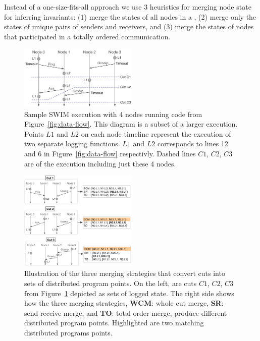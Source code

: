 Instead of a one-size-fits-all approach we use 3 heuristics for
merging node state for inferring invariants: (1) merge the states of
all nodes in a \scc, (2) merge only the states of unique pairs of
senders and receivers, and (3) merge the states of nodes that
participated in a totally ordered communication.
    
\begin{figure}[h]
    \includegraphics[width=0.5\textwidth]{fig/gossip-execution-dig}
    \caption{Sample SWIM execution with 4 nodes running code from
        Figure~\ref{fig:data-flow}. This diagram is a subset of a
        larger execution. Points $L1$ and $L2$ on each node timeline
        represent the execution of two separate logging functions. $L1$
        and $L2$ corresponds to lines 12 and 6 in
        Figure~\ref{fig:data-flow} respectivly.  Dashed lines $C1$,
        $C2$, $C3$ are  of the execution including just these 4
nodes.} \label{fig:gossip-execution} \end{figure}

\begin{figure}[h]
    \includegraphics[width=0.5\textwidth]{fig/cuts-to-dpp-dig}
    \caption{Illustration of the three merging strategies that convert
      cuts into sets of distributed program points. On the left, are
      cuts $C1$, $C2$, $C3$ from Figure~\ref{fig:gossip-execution}
      depicted as sets of logged state. The right side shows how the
      three merging strategies, \textbf{WCM}: whole cut merge,
      \textbf{SR}: send-receive merge, and \textbf{TO}: total order
      merge, produce different distributed program points. Highlighted
      are two matching distributed programs points.}
\label{fig:cuts-to-dpp}

\end{figure}

